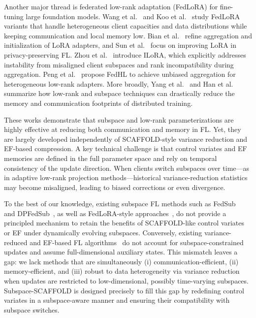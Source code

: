 Another major thread is federated low-rank adaptation (FedLoRA) for fine-tuning large foundation models. Wang et al.~\cite{wang2024flora} and Koo et al.~\cite{koo2024robustfedlora} study FedLoRA variants that handle heterogeneous client capacities and data distributions while keeping communication and local memory low. Bian et al.~\cite{bian2024lorafair} refine aggregation and initialization of LoRA adapters, and Sun et al.~\cite{sun2024improvinglora} focus on improving LoRA in privacy-preserving FL. Zhou et al.~\cite{zhou2025ilora} introduce ILoRA, which explicitly addresses instability from misaligned client subspaces and rank incompatibility during aggregation. Peng et al.~\cite{peng2025fedhl} propose FedHL to achieve unbiased aggregation for heterogeneous low-rank adapters. More broadly, Yang et al.~\cite{yang2025fedlora_survey} and Han et al.~\cite{han2024peftsurvey} summarize how low-rank and subspace techniques can drastically reduce the memory and communication footprints of distributed training.

These works demonstrate that subspace and low-rank parameterizations are highly effective at reducing both communication and memory in FL. Yet, they are largely developed independently of SCAFFOLD-style variance reduction and EF-based compression. A key technical challenge is that control variates and EF memories are defined in the full parameter space and rely on temporal consistency of the update direction. When clients switch subspaces over time---as in adaptive low-rank projection methods---historical variance-reduction statistics may become misaligned, leading to biased corrections or even divergence.

To the best of our knowledge, existing subspace FL methods such as FedSub~\cite{zhang2025fedsub} and DPFedSub~\cite{wu2025dpfedsub}, as well as FedLoRA-style approaches~\cite{wang2024flora,zhou2025ilora,koo2024robustfedlora}, do not provide a principled mechanism to retain the benefits of SCAFFOLD-like control variates or EF under dynamically evolving subspaces. Conversely, existing variance-reduced and EF-based FL algorithms~\cite{karimireddy2020scaffold,karimireddy2019error,wang2025quantizedvr,zhang2025modeldiscrepancy,wang2025proportionalvr} do not account for subspace-constrained updates and assume full-dimensional auxiliary states. This mismatch leaves a gap: we lack methods that are simultaneously (i) communication-efficient, (ii) memory-efficient, and (iii) robust to data heterogeneity via variance reduction when updates are restricted to low-dimensional, possibly time-varying subspaces. Subspace-SCAFFOLD is designed precisely to fill this gap by redefining control variates in a subspace-aware manner and ensuring their compatibility with subspace switches.

